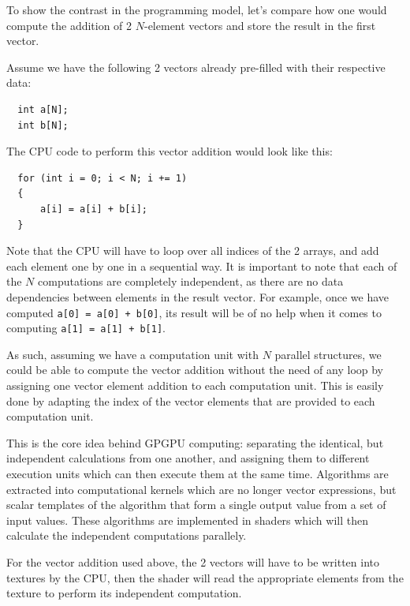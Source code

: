 \documentclass[12pt, a4paper]{report}
\begin{document}
\begin{sloppypar}
\begin{enumerate}
To show the contrast in the programming model, let's compare how one would
compute the addition of 2 $N$-element vectors and store the result in the first
vector.

Assume we have the following 2 vectors already pre-filled with their respective
data:

\begin{lstlisting}
  int a[N];
  int b[N];
\end{lstlisting}

The CPU code to perform this vector addition would look like this:

\begin{lstlisting}
  for (int i = 0; i < N; i += 1)
  {
      a[i] = a[i] + b[i];
  }
\end{lstlisting}

Note that the CPU will have to loop over all indices of the 2 arrays, and add
each element one by one in a sequential way.
It is important to note that each of the $N$ computations are completely
independent, as there are no data dependencies between elements in the result
vector.
For example, once we have computed \verb!a[0] = a[0] + b[0]!, its result will be
of no help when it comes to computing \verb!a[1] = a[1] + b[1]!.

As such, assuming we have a computation unit with $N$ parallel structures, we
could be able to compute the vector addition without the need of any loop by
assigning one vector element addition to each computation unit.
This is easily done by adapting the index of the vector elements that are
provided to each computation unit.

This is the core idea behind GPGPU computing: separating the identical, but
independent calculations from one another, and assigning them to different
execution units which can then execute them at the same time.
Algorithms are extracted into computational kernels which are no longer vector
expressions, but scalar templates of the algorithm that form a single output
value from a set of input values.
These algorithms are implemented in shaders which will then calculate the
independent computations parallely.

For the vector addition used above, the 2 vectors will have to be written into
textures by the CPU, then the shader will read the appropriate elements from the
texture to perform its independent computation.


\end{enumerate}
\end{sloppypar}
\end{document}

